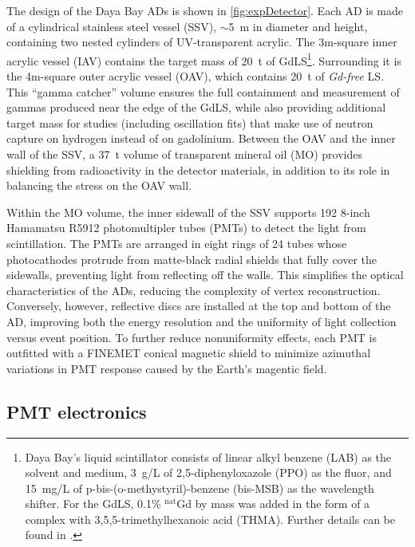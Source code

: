 \documentclass[../thesis.tex]{subfiles}
\begin{document}
The design of the Daya Bay ADs is shown in \autoref{fig:expDetector}. Each AD is
made of a cylindrical stainless steel vessel (SSV), $\sim$5~m in diameter and
height, containing two nested cylinders of UV-transparent acrylic. The 3m-square
inner acrylic vessel (IAV) contains the target mass of 20~t of
GdLS\footnote{Daya Bay's liquid scintillator consists of linear alkyl benzene
  (LAB) as the solvent and medium, 3~g/L of 2,5-diphenyloxazole (PPO) as the
  fluor, and 15~mg/L of p-bis-(o-methystyril)-benzene (bis-MSB) as the
  wavelength shifter. For the GdLS, 0.1\% $^{\text{nat}}$Gd by mass was added in
  the form of a complex with 3,5,5-trimethylhexanoic acid (THMA). Further
  details can be found in \cite{Beriguete_2014}.}. Surrounding it is the
4m-square outer acrylic vessel (OAV), which contains 20~t of \emph{Gd-free}
LS. This ``gamma catcher'' volume ensures the full containment and measurement
of gammas produced near the edge of the GdLS, while also providing additional
target mass for studies (including oscillation fits) that make use of neutron
capture on hydrogen instead of on gadolinium. Between the OAV and the inner wall
of the SSV, a 37~t volume of transparent mineral oil (MO) provides shielding
from radioactivity in the detector materials, in addition to its role in
balancing the stress on the OAV wall.

Within the MO volume, the inner sidewall of the SSV supports 192 8-inch
Hamamatsu R5912 photomultipler tubes (PMTs) to detect the light from
scintillation. The PMTs are arranged in eight rings of 24 tubes whose
photocathodes protrude from matte-black radial shields that fully cover the
sidewalls, preventing light from reflecting off the walls. This simplifies the
optical characteristics of the ADs, reducing the complexity of vertex
reconstruction. Conversely, however, reflective discs are installed at the top
and bottom of the AD, improving both the energy resolution and the uniformity of
light collection versus event position. To further reduce nonuniformity effects,
each PMT is outfitted with a FINEMET conical magnetic shield to minimize
azimuthal variations in PMT response caused by the Earth's magentic field.

\subsection{PMT electronics}
\label{sec:expPmtElec}
\end{document}
